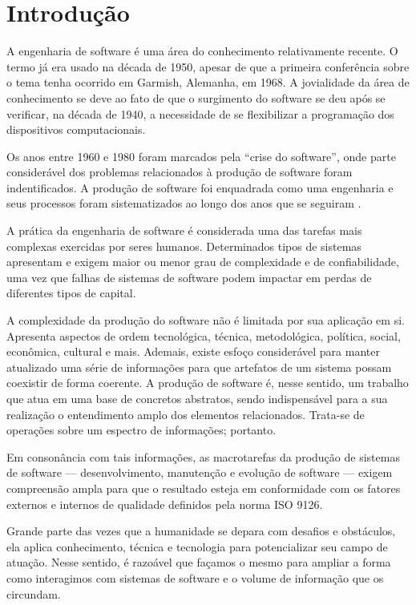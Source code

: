 
\section{Introdução}

\lettrine{A}{} engenharia de software é uma área do conhecimento relativamente
recente. O termo já era usado na década de 1950, apesar de que a primeira
conferência sobre o tema tenha ocorrido em Garmish, Alemanha, em 1968. A
jovialidade da área de conhecimento se deve ao fato de que o surgimento do
software se deu após se verificar, na década de 1940, a necessidade de se
flexibilizar a programação dos dispositivos computacionais\cite{Wazlawick2013}.

Os anos entre 1960 e 1980 foram marcados pela ``crise do software'', onde parte
considerável dos problemas relacionados à produção de software foram
indentificados. A produção de software foi enquadrada como uma engenharia e seus
processos foram sistematizados ao longo dos anos que se seguiram
\cite{Wazlawick2013}.

A prática da engenharia de software é considerada uma das tarefas mais complexas
exercidas por seres humanos\cite{Crockford2008}. Determinados tipos de sistemas
apresentam e exigem maior ou menor grau de complexidade e de confiabilidade, uma
vez que falhas de sistemas de software podem impactar em perdas de diferentes
tipos de capital.

A complexidade da produção do software não é limitada por sua aplicação em si.
Apresenta aspectos de ordem tecnológica, técnica, metodológica, política,
social, econômica, cultural e mais. Ademais, existe esfoço considerável para
manter atualizado uma série de informações para que artefatos de um sistema
possam coexistir de forma coerente. A produção de software é, nesse sentido,
um trabalho que atua em uma base de concretos abstratos, sendo indispensável
para a sua realização o entendimento amplo dos elementos relacionados. Trata-se
de operações sobre um espectro de informações; portanto.

Em consonância com tais informações, as macrotarefas da produção de sistemas de
software --- desenvolvimento, manutenção e evolução de software --- exigem
compreensão ampla para que o resultado esteja em conformidade com os fatores
externos e internos de qualidade definidos pela norma ISO 9126\cite{ISOIEC9126}.

Grande parte das vezes que a humanidade se depara com desafios e obstáculos,
ela aplica conhecimento, técnica e tecnologia para potencializar seu campo de
atuação. Nesse sentido, é razoável que façamos o mesmo para ampliar a forma como
interagimos com sistemas de software e o volume de informação que os circundam.
